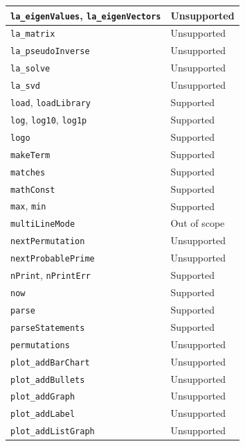 \begin{longtable}{|p{4cm}|p{9cm}|}
        \hline
        \texttt{la\_eigenValues}, \texttt{la\_eigenVectors} & Unsupported \\
        \hline
        \texttt{la\_matrix} & Unsupported \\
        \hline
        \texttt{la\_pseudoInverse} & Unsupported \\
        \hline
        \texttt{la\_solve} & Unsupported \\
        \hline
        \texttt{la\_svd} & Unsupported \\
        \hline
        \texttt{load}, \texttt{loadLibrary} & Supported \\
        \hline
        \texttt{log}, \texttt{log10}, \texttt{log1p} & Supported \\
        \hline
        \texttt{logo} & Supported \\
        \hline
        \texttt{makeTerm} & Supported \\
        \hline
        \texttt{matches} & Supported \\
        \hline
        \texttt{mathConst} & Supported \\
        \hline
        \texttt{max}, \texttt{min} & Supported \\
        \hline
        \texttt{multiLineMode} & Out of scope \\
        \hline
        \texttt{nextPermutation} & Unsupported \\
        \hline
        \texttt{nextProbablePrime} & Unsupported \\
        \hline
        \texttt{nPrint}, \texttt{nPrintErr} & Supported \\
        \hline
        \texttt{now} & Supported \\
        \hline
        \texttt{parse} & Supported \\
        \hline
        \texttt{parseStatements} & Supported \\
        \hline
        \texttt{permutations} & Unsupported \\
        \hline
        \texttt{plot\_addBarChart} & Unsupported \\
        \hline
        \texttt{plot\_addBullets} & Unsupported \\
        \hline
        \texttt{plot\_addGraph} & Unsupported \\
        \hline
        \texttt{plot\_addLabel} & Unsupported \\
        \hline
        \texttt{plot\_addListGraph} & Unsupported \\

\end{longtable}
